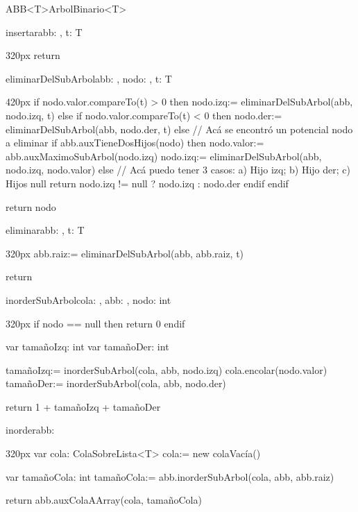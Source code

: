 \documentclass[10pt,a4paper]{article}
\begin{document}
\begin{ModuloImplements}{ABB<T>}{ArbolBinario<T>}
\begin{proc}{insertar}{\Inout abb: , \In t: T}{}
\begin{ImplementationCode}{320px}
      return
    \end{ImplementationCode}
  \end{proc}
  \vspace{2em}
  \begin{proc}{eliminarDelSubArbol}{\Inout abb: , \In nodo: , \In t: T}{}
    \begin{ImplementationCode}{420px}
      if nodo.valor.compareTo(t) > 0 then
        nodo.izq:= eliminarDelSubArbol(abb, nodo.izq, t)
      else if nodo.valor.compareTo(t) < 0 then
        nodo.der:= eliminarDelSubArbol(abb, nodo.der, t)
      else
        // Acá se encontró un potencial nodo a eliminar
        if abb.auxTieneDosHijos(nodo) then
          nodo.valor:= abb.auxMaximoSubArbol(nodo.izq)
          nodo.izq:= eliminarDelSubArbol(abb, nodo.izq, nodo.valor)
        else
          // Acá puedo tener 3 casos: a) Hijo izq; b) Hijo der; c) Hijos null
          return nodo.izq != null ? nodo.izq : nodo.der
        endif
      endif

      return nodo
    \end{ImplementationCode}
  \end{proc}
  \begin{proc}{eliminar}{\Inout abb: , \In t: T}{}
    \begin{ImplementationCode}{320px}
      abb.raiz:= eliminarDelSubArbol(abb, abb.raiz, t)

      return
    \end{ImplementationCode}
  \end{proc}
  \vspace{2em}
  \begin{proc}{inorderSubArbol}{\Inout cola: , \In abb: , \In nodo: }{int}
    \begin{ImplementationCode}{320px}
      if nodo == null then
        return 0
      endif

      var tamañoIzq: int
      var tamañoDer: int

      tamañoIzq:= inorderSubArbol(cola, abb, nodo.izq)
      cola.encolar(nodo.valor)
      tamañoDer:= inorderSubArbol(cola, abb, nodo.der)

      return 1 + tamañoIzq + tamañoDer
    \end{ImplementationCode}
  \end{proc}
  \newpage
  \begin{proc}{inorder}{\In abb: }{}
    \begin{ImplementationCode}{320px}
      var cola: ColaSobreLista<T>
          cola:= new colaVacía()

      var tamañoCola: int
          tamañoCola:= abb.inorderSubArbol(cola, abb, abb.raiz)

      return abb.auxColaAArray(cola, tamañoCola)
    \end{ImplementationCode}
  \end{proc}
\end{ModuloImplements}
\end{document}
